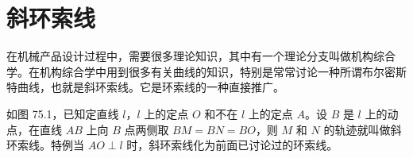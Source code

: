 \section{斜环索线}

在机械产品设计过程中，需要很多理论知识，其中有一个理论分支叫做机构综合学。在机构综合学中用到很多有关曲线的知识，特别是常常讨论一种所谓布尔密斯特曲线，也就是斜环索线。它是环索线的一种直接推广。

\noindent
\begin{minipage}[t]{0.52\textwidth}
  \vspace{0pt}
  \hspace*{2em}如图 75.1，已知定直线 $l$，$l$ 上的定点 $O$ 和不在 $l$ 上的定点 $A$。设 $B$ 是 $l$ 上的动点，在直线 $AB$ 上向 $B$ 点两侧取 $BM=BN=BO$，则 $M$ 和 $N$ 的轨迹就叫做斜环索线。特例当 $AO\perp l$ 时，斜环索线化为前面已讨论过的环索线。
\end{minipage}
\hfill
